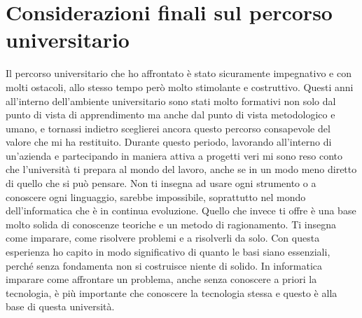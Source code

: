 \section{Considerazioni finali sul percorso universitario}
Il percorso universitario che ho affrontato è stato sicuramente impegnativo e con molti ostacoli, allo stesso tempo però molto stimolante e costruttivo. Questi anni all'interno dell'ambiente universitario sono stati molto formativi non solo dal punto di vista di apprendimento ma anche dal punto di vista metodologico e umano, e tornassi indietro sceglierei ancora questo percorso consapevole del valore che mi ha restituito.
Durante questo periodo, lavorando all'interno di un'azienda e partecipando in maniera attiva a progetti veri mi sono reso conto che l'università ti prepara al mondo del lavoro, anche se in un modo meno diretto di quello che si può pensare. Non ti insegna ad usare ogni strumento o a conoscere ogni linguaggio, sarebbe impossibile, soprattutto nel mondo dell'informatica che è in continua evoluzione.
Quello che invece ti offre è una base molto solida di conoscenze teoriche e un metodo di ragionamento. Ti insegna come imparare, come risolvere problemi e a risolverli da solo.
Con questa esperienza ho capito in modo significativo di quanto le basi siano essenziali, perché senza fondamenta non si costruisce niente di solido.
In informatica imparare come affrontare un problema, anche senza conoscere a priori la tecnologia, è più importante che conoscere la tecnologia stessa e questo è alla base di questa università.


\newpage


